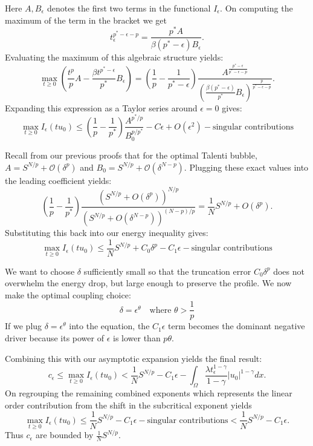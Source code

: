 \documentclass[12pt]{extarticle}
\theoremstyle{definition}
\theoremstyle{remark}
\theoremstyle{definition}
\numberwithin{equation}{section}
\numberwithin{equation}{section}
\begin{document}
			Here $A, B_{\epsilon}$ denotes the first two terms in the functional $I_{\epsilon}$. On computing the maximum of the term in the bracket we get $$ t_\epsilon^{p^*-\epsilon-p} = \frac{p^* A}{\beta (p^*-\epsilon) B_\epsilon}.$$
			Evaluating the maximum of this algebraic structure yields:$$\max_{t \geq 0} \left( \frac{t^p}{p} A - \frac{\beta t^{p^*-\epsilon}}{p^*} B_\epsilon \right) = \left( \frac{1}{p} - \frac{1}{p^*-\epsilon} \right) \frac{A^{\frac{p^*-\epsilon}{p^*-\epsilon-p}}}{\left(\frac{\beta (p^*-\epsilon)}{p^*} B_\epsilon\right)^{\frac{p}{p^*-\epsilon-p}}}.$$
			Expanding this expression as a Taylor series around $\epsilon = 0$ gives:$$\max_{t \geq 0} I_\epsilon(t u_0) \leq \left( \frac{1}{p} - \frac{1}{p^*} \right) \frac{A^{p^*/p}}{B_0^{p/p^*}} - C \epsilon + O(\epsilon^2) - \text{singular contributions}$$
			
			
			Recall from our previous proofs that for the optimal Talenti bubble, $A = S^{N/p} + \mathcal{O}(\delta^p)$ and $B_0 = S^{N/p} + \mathcal{O}(\delta^{N-p})$. Plugging these exact values into the leading coefficient yields:$$\left( \frac{1}{p} - \frac{1}{p^*} \right) \frac{\left(S^{N/p} + O(\delta^p)\right)^{N/p}}{\left(S^{N/p} + O(\delta^{N-p})\right)^{(N-p)/p}} = \frac{1}{N} S^{N/p} + O(\delta^p).$$
			Substituting this back into our energy inequality gives:$$\max_{t \geq 0} I_\epsilon(t u_0) \leq \frac{1}{N} S^{N/p} + C_0 \delta^p - C_1 \epsilon - \text{singular contributions}$$
			
			We want to choose $\delta$ sufficiently small so that the truncation error $C_0\delta^p$ does not overwhelm the energy drop, but large enough to preserve the profile. We now make the optimal coupling choice:$$\delta = \epsilon^\theta \quad \text{where } \theta > \frac{1}{p}$$If we plug $\delta = \epsilon^\theta$ into the equation, the $C_1 \epsilon$ term becomes the dominant negative driver because its power of $\epsilon$ is lower than $p\theta$.
			
			Combining this with our asymptotic expansion yields the final result:$$c_\epsilon \leq \max_{t \geq 0} I_\epsilon(t u_0) < \frac{1}{N} S^{N/p} - C_1 \epsilon - \int_\Omega \frac{\lambda t_\epsilon^{1-\gamma}}{1-\gamma}|u_0|^{1-\gamma}dx.$$ On regrouping the remaining combined exponents which represents the linear order contribution from the shift in the subcritical exponent yields 
			$$\max_{t \geq 0} I_\epsilon(t u_0) \leq \frac{1}{N} S^{N/p} - C_1 \epsilon - \text{singular contributions}<\frac{1}{N} S^{N/p} - C_1 \epsilon.$$
			Thus $c_{\epsilon}$ are bounded by $\frac{1}{N} S^{N/p} $.
			
\end{document}
